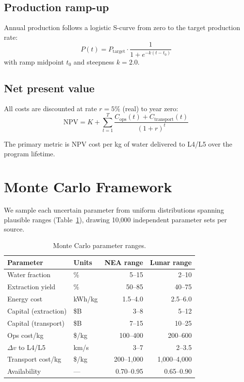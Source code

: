 \documentclass[preprint,12pt]{elsarticle}
\begin{document}
\subsection{Production ramp-up}

Annual production follows a logistic S-curve from zero to the target production rate:
\begin{equation}
    P(t) = P_\text{target} \cdot \frac{1}{1 + e^{-k(t - t_0)}}
    \label{eq:ramp}
\end{equation}
with ramp midpoint $t_0$ and steepness $k = 2.0$.

\subsection{Net present value}

All costs are discounted at rate $r = 5\%$ (real) to year zero:
\begin{equation}
    \text{NPV} = K + \sum_{t=1}^{T} \frac{C_\text{ops}(t) + C_\text{transport}(t)}{(1+r)^t}
    \label{eq:npv}
\end{equation}

The primary metric is NPV cost per kg of water delivered to L4/L5 over the program lifetime.

\section{Monte Carlo Framework}
\label{sec:mc}

We sample each uncertain parameter from uniform distributions spanning plausible ranges (Table~\ref{tab:mc-params}), drawing 10,000 independent parameter sets per source.

\begin{table}[ht]
\centering
\caption{Monte Carlo parameter ranges.}
\label{tab:mc-params}
\begin{tabular}{llrr}
\toprule
\textbf{Parameter} & \textbf{Units} & \textbf{NEA range} & \textbf{Lunar range} \\
\midrule
Water fraction & \% & 5--15 & 2--10 \\
Extraction yield & \% & 50--85 & 40--75 \\
Energy cost & kWh/kg & 1.5--4.0 & 2.5--6.0 \\
Capital (extraction) & \$B & 3--8 & 5--12 \\
Capital (transport) & \$B & 7--15 & 10--25 \\
Ops cost/kg & \$/kg & 100--400 & 200--600 \\
$\Delta v$ to L4/L5 & km/s & 3--7 & 2--3.5 \\
Transport cost/kg & \$/kg & 200--1{,}000 & 1{,}000--4{,}000 \\
Availability & --- & 0.70--0.95 & 0.65--0.90 \\
\bottomrule
\end{tabular}
\end{table}
\end{document}
